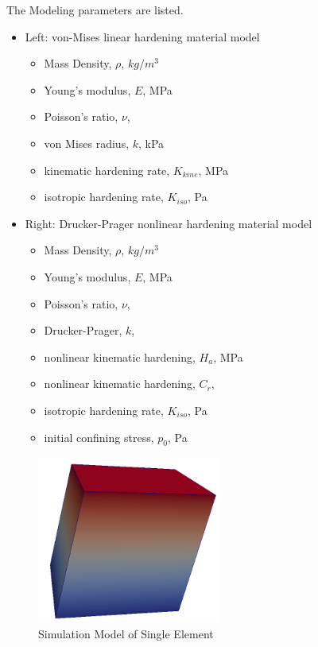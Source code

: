 The Modeling parameters are listed.
\begin{itemize}
  \item Left: von-Mises linear hardening material model 
  \begin{itemize}
    \item Mass Density, $\rho$, \enspace {} $kg/m^3$
    \item Young's modulus, $E$, \enspace {} MPa
    \item Poisson's ratio, $\nu$, \enspace {}
    \item von Mises radius, $k$, \enspace {} kPa
    \item kinematic hardening rate, $K_{kine} $, \enspace {} MPa
    \item isotropic hardening rate, $K_{iso} $, \enspace {} Pa
  \end{itemize}
  \item Right: Drucker-Prager nonlinear hardening material model 
  \begin{itemize}
    \item Mass Density, $\rho$, \enspace {} $kg/m^3$
    \item Young's modulus, $E$, \enspace {} MPa
    \item Poisson's ratio, $\nu$, \enspace {}
    \item Drucker-Prager, $k$, \enspace {}
    \item nonlinear kinematic hardening, $H_a$, \enspace {} MPa
    \item nonlinear kinematic hardening, $C_r$, \enspace {}
    \item isotropic hardening rate, $K_{iso} $, \enspace {} Pa
    \item initial confining stress, $p_0$, \enspace {} Pa
  \end{itemize}
\end{itemize}

\begin{figure}[H]
  \centering
  \includegraphics[width = 6cm]{./Figure-files/Day3/Single_element_Models_illustrate_the_elastic-plastic_behavior/overview.png}
  \caption{Simulation Model of Single Element}
  \label{fig_single_element_elastic_plastic1}
\end{figure}


